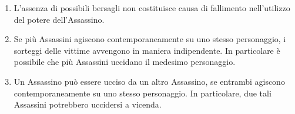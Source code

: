 \documentclass[a4paper,10pt]{article}
\begin{document}
\begin{enumerate}
	
	
	\item L'assenza di possibili bersagli non costituisce causa di fallimento nell'utilizzo del potere dell'Assassino.
	
	\item Se più Assassini agiscono contemporaneamente su uno stesso personaggio, i sorteggi delle vittime avvengono in maniera indipendente.
	In particolare è possibile che più Assassini uccidano il medesimo personaggio.
	
	\item Un Assassino può essere ucciso da un altro Assassino, se entrambi agiscono contemporaneamente su uno stesso personaggio. In particolare, due tali Assassini potrebbero uccidersi a vicenda.
	
 


\end{enumerate}
\end{document}
